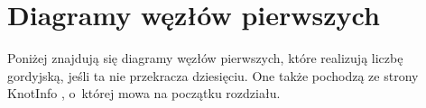 
\section{Diagramy węzłów pierwszych}

Poniżej znajdują się diagramy węzłów pierwszych, które realizują liczbę gordyjską, jeśli ta nie przekracza dziesięciu.
One także pochodzą ze strony KnotInfo \cite{knotinfo22}, o~której mowa na początku rozdziału.

